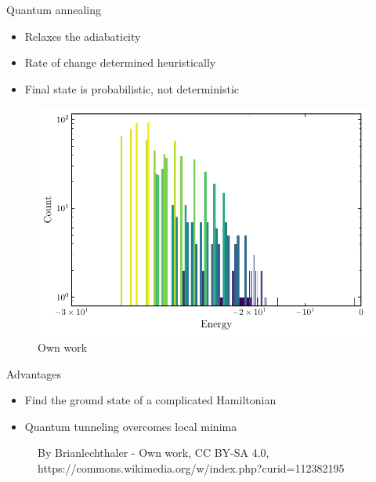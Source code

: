 \documentclass[handout]{beamer}
\begin{document}
\begin{frame}{Quantum annealing}

    \begin{itemize}[<+(1)->]
        \item Relaxes the adiabaticity
        \item Rate of change determined heuristically
        \item Final state is probabilistic, not deterministic
    \end{itemize}

    \begin{figure}
        \includegraphics[width=.6\textwidth]{histogram_pad.pdf}
        \caption{Own work}
    \end{figure}

\end{frame}

\begin{frame}{Advantages}

    \begin{itemize}[<+(1)->]
        \item Find the ground state of a complicated Hamiltonian
        \item Quantum tunneling overcomes local minima
    \end{itemize}

    \begin{figure}
        {
            \def\svgwidth{.8\textwidth}
            \tiny\selectfont
            
        }
        \caption{By Brianlechthaler - Own work, CC BY-SA 4.0, https://commons.wikimedia.org/w/index.php?curid=112382195}
    \end{figure}

    
\end{frame}
\end{document}
